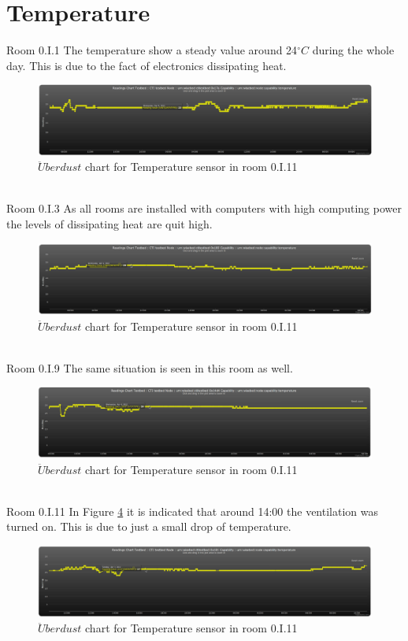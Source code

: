 \documentclass[12pt,a4paper]{report}
\begin{document}
\section{Temperature}
%
{Room 0.I.1}
%
The temperature show a steady value around 24$^\circ C$ during the whole day. This is due to the fact of electronics dissipating heat.
\begin{figure}[H]
\centering
\includegraphics*[scale=0.3]{temp_1}
\caption{$\ddot{U}berdust$ chart for Temperature sensor in room 0.I.11}
\label{chart_temp_1}
\end{figure}
\ \\
%
{Room 0.I.3}
%
As all rooms are installed with computers with high computing power the levels of dissipating heat are quit high.
\begin{figure}[H]
\centering
\includegraphics*[scale=0.3]{temp_3}
\caption{$\ddot{U}berdust$ chart for Temperature sensor in room 0.I.11}
\label{chart_temp_3}
\end{figure}
\ \\
%
{Room 0.I.9}
%
The same situation is seen in this room as well.
\begin{figure}[H]
\centering
\includegraphics*[scale=0.3]{temp_9}
\caption{$\ddot{U}berdust$ chart for Temperature sensor in room 0.I.11}
\label{chart_temp_9}
\end{figure}
\ \\
%
{Room 0.I.11}
%
In Figure \ref{chart_temp_11} it is indicated that around 14:00 the ventilation was turned on. This is due to just a small drop of temperature.
\begin{figure}[H]
\centering
\includegraphics*[scale=0.3]{temp_11}
\caption{$\ddot{U}berdust$ chart for Temperature sensor in room 0.I.11}
\label{chart_temp_11}
\end{figure}
\ \\
%
\end{document}
